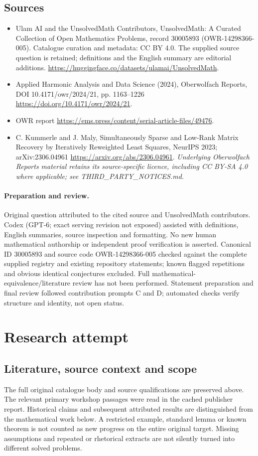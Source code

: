 \documentclass[11pt]{article}
\begin{document}
\subsection{Sources}
\begin{itemize}
\item[S1] Ulam AI and the UnsolvedMath Contributors, UnsolvedMath: A Curated Collection of Open Mathematics Problems, record 30005893 (OWR-14298366-005). Catalogue curation and metadata: CC BY 4.0. The supplied source question is retained; definitions and the English summary are editorial additions.
\url{https://huggingface.co/datasets/ulamai/UnsolvedMath}.
\item[S2] Applied Harmonic Analysis and Data Science (2024), Oberwolfach Reports, DOI 10.4171/owr/2024/21, pp. 1163--1226
\url{https://doi.org/10.4171/owr/2024/21}.
\item[S3] OWR report
\url{https://ems.press/content/serial-article-files/49476}.
\item[S4] C. Kummerle and J. Maly, Simultaneously Sparse and Low-Rank Matrix Recovery by Iteratively Reweighted Least Squares, NeurIPS 2023; arXiv:2306.04961
\url{https://arxiv.org/abs/2306.04961}.
\textit{Underlying Oberwolfach Reports material retains its source-specific licence, including CC BY-SA 4.0 where applicable; see THIRD\_PARTY\_NOTICES.md.}
\end{itemize}
\paragraph{Preparation and review.}
Original question attributed to the cited source and UnsolvedMath contributors. Codex (GPT-6; exact serving revision not exposed) assisted with definitions, English summaries, source inspection and formatting. No new human mathematical authorship or independent proof verification is asserted. Canonical ID 30005893 and source code OWR-14298366-005 checked against the complete supplied registry and existing repository statements; known flagged repetitions and obvious identical conjectures excluded. Full mathematical-equivalence/literature review has not been performed. Statement preparation and final review followed contribution prompts C and D; automated checks verify structure and identity, not open status.
\label{end:30005893}

\section{Research attempt}
\subsection{Literature, source context and scope}
The full original catalogue body and source qualifications are preserved above. The relevant primary workshop passages were read in the cached publisher report. Historical claims and subsequent attributed results are distinguished from the mathematical work below. A restricted example, standard lemma or known theorem is not counted as new progress on the entire original target. Missing assumptions and repeated or rhetorical extracts are not silently turned into different solved problems.
\end{document}
